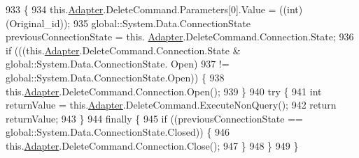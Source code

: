 \begin{DoxyCode}
933                                                    \{
934             this.\hyperlink{class_proyecto___integrador__3_1_1ds_servicios_table_adapters_1_1_servicios_table_adapter_a6e2d84a1b2c925ab5f078c403b1e3ecf}{Adapter}.DeleteCommand.Parameters[0].Value = ((int)(Original\_id));
935             global::System.Data.ConnectionState previousConnectionState = this.
      \hyperlink{class_proyecto___integrador__3_1_1ds_servicios_table_adapters_1_1_servicios_table_adapter_a6e2d84a1b2c925ab5f078c403b1e3ecf}{Adapter}.DeleteCommand.Connection.State;
936             \textcolor{keywordflow}{if} (((this.\hyperlink{class_proyecto___integrador__3_1_1ds_servicios_table_adapters_1_1_servicios_table_adapter_a6e2d84a1b2c925ab5f078c403b1e3ecf}{Adapter}.DeleteCommand.Connection.State & global::System.Data.ConnectionState.
      Open) 
937                         != global::System.Data.ConnectionState.Open)) \{
938                 this.\hyperlink{class_proyecto___integrador__3_1_1ds_servicios_table_adapters_1_1_servicios_table_adapter_a6e2d84a1b2c925ab5f078c403b1e3ecf}{Adapter}.DeleteCommand.Connection.Open();
939             \}
940             \textcolor{keywordflow}{try} \{
941                 \textcolor{keywordtype}{int} returnValue = this.\hyperlink{class_proyecto___integrador__3_1_1ds_servicios_table_adapters_1_1_servicios_table_adapter_a6e2d84a1b2c925ab5f078c403b1e3ecf}{Adapter}.DeleteCommand.ExecuteNonQuery();
942                 \textcolor{keywordflow}{return} returnValue;
943             \}
944             \textcolor{keywordflow}{finally} \{
945                 \textcolor{keywordflow}{if} ((previousConnectionState == global::System.Data.ConnectionState.Closed)) \{
946                     this.\hyperlink{class_proyecto___integrador__3_1_1ds_servicios_table_adapters_1_1_servicios_table_adapter_a6e2d84a1b2c925ab5f078c403b1e3ecf}{Adapter}.DeleteCommand.Connection.Close();
947                 \}
948             \}
949         \}
\end{DoxyCode}
